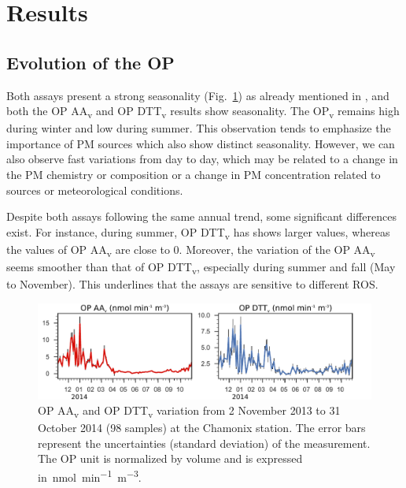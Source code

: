 \documentclass[acp, manuscript]{copernicus}
\begin{document}
\section{Results}\label{results}

\subsection{Evolution of the OP}\label{evolution-of-the-op}

Both assays present a strong seasonality (Fig.~\ref{fig:OPts}) as already
mentioned in \citet{calas_importance_2017}, and both the OP AA\textsubscript{v}
and OP DTT\textsubscript{v} results show seasonality. The OP\textsubscript{v}
remains high during winter and low during summer.  This observation tends to
emphasize the importance of PM sources which also show distinct seasonality.
However, we can also observe fast variations from day to day, which may be
related to a change in the PM chemistry or composition or a change in PM concentration
related to sources or meteorological conditions.

Despite both assays following the same annual trend, some significant
differences exist. For instance, during summer, OP DTT\textsubscript{v}
has shows larger values, whereas the values of OP AA\textsubscript{v} are close
to 0. Moreover, the variation of the OP AA\textsubscript{v} seems
smoother than that of OP DTT\textsubscript{v}, especially during summer
and fall (May to November). This underlines that the assays are
sensitive to different ROS.

\begin{figure}[h]
    \centering
    \includegraphics[width=\textwidth]{figures/fig02}
    \caption{OP AA\textsubscript{v} and OP DTT\textsubscript{v} variation from
        2 November 2013 to 31 October 2014 (98 samples) at the Chamonix
        station. The error bars represent the uncertainties (standard
        deviation) of the measurement. The OP unit is normalized by volume and
        is expressed in~\unit{nmol~min^{-1}~m^{-3}}.  }
    \label{fig:OPts}
\end{figure}
\end{document}
